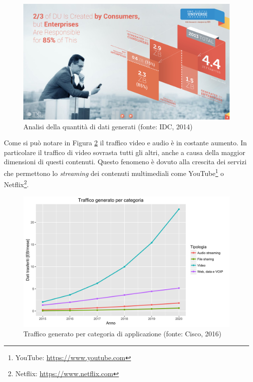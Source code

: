 \begin{figure}[ht]
	\centering
	\includegraphics[width=\textwidth]{1-introduzione/Immagini/dati-generati-consumer.pdf}
	\caption[Analisi della quantità di dati generati]{Analisi della quantità di dati generati (fonte: IDC, 2014)\label{fig:analisi-dati-generati}}
\end{figure}

Come si può notare in Figura \ref{fig:traffico-categoria-applicazione} il traffico video e audio è in costante aumento. In particolare il traffico di video sovrasta tutti gli altri, anche a causa della maggior dimensioni di questi contenuti. Questo fenomeno è dovuto alla crescita dei servizi che permettono lo \emph{streaming} dei contenuti multimediali come YouTube\footnote{YouTube: \url{https://www.youtube.com}} o Netflix\footnote{Netflix: \url{https://www.netflix.com}}.

\begin{figure}[ht]
	\centering
	\includegraphics[width=\textwidth]{1-introduzione/Immagini/traffico-categoria.png}
	\caption[Traffico generato per categoria di applicazione]{Traffico generato per categoria di applicazione (fonte: Cisco, 2016)\label{fig:traffico-categoria-applicazione}}
\end{figure}

